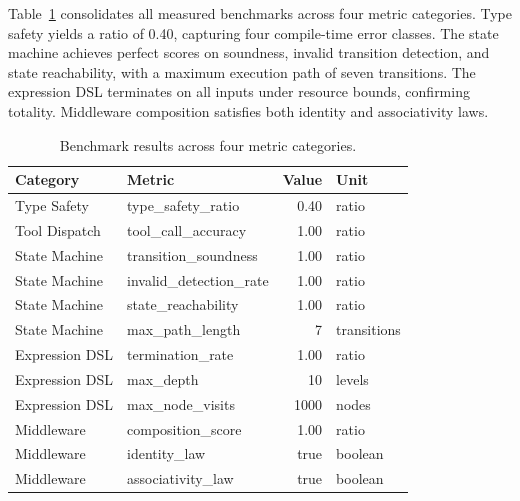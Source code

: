 Table~\ref{tab:benchmark} consolidates all measured benchmarks across four metric categories. Type safety yields a ratio of 0.40, capturing four compile-time error classes. The state machine achieves perfect scores on soundness, invalid transition detection, and state reachability, with a maximum execution path of seven transitions. The expression DSL terminates on all inputs under resource bounds, confirming totality. Middleware composition satisfies both identity and associativity laws.

\begin{table}[t]
\caption{Benchmark results across four metric categories.}
\label{tab:benchmark}
\centering
\small
\begin{tabular}{llrl}
\toprule
Category & Metric & Value & Unit \\
\midrule
Type Safety & type\_safety\_ratio & 0.40 & ratio \\
Tool Dispatch & tool\_call\_accuracy & 1.00 & ratio \\
State Machine & transition\_soundness & 1.00 & ratio \\
State Machine & invalid\_detection\_rate & 1.00 & ratio \\
State Machine & state\_reachability & 1.00 & ratio \\
State Machine & max\_path\_length & 7 & transitions \\
Expression DSL & termination\_rate & 1.00 & ratio \\
Expression DSL & max\_depth & 10 & levels \\
Expression DSL & max\_node\_visits & 1000 & nodes \\
Middleware & composition\_score & 1.00 & ratio \\
Middleware & identity\_law & true & boolean \\
Middleware & associativity\_law & true & boolean \\
\bottomrule
\end{tabular}
\end{table}